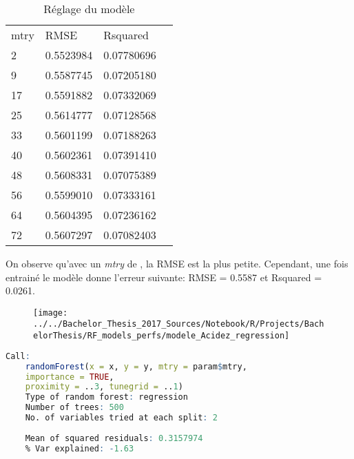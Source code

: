 \begin{table}[H]
	\centering
	\caption{Réglage du modèle}
	\label{RF_Acidez_Resampling}
	\begin{tabular}{llll}
	    mtry & RMSE      & Rsquared   \\
	    2    & 0.5523984 & 0.07780696 \\
	    9    & 0.5587745 & 0.07205180 \\
	    17   & 0.5591882 & 0.07332069 \\
	    25   & 0.5614777 & 0.07128568 \\
	    33   & 0.5601199 & 0.07188263 \\
	    40   & 0.5602361 & 0.07391410 \\
	    48   & 0.5608331 & 0.07075389 \\
	    56   & 0.5599010 & 0.07333161 \\
	    64   & 0.5604395 & 0.07236162 \\
	    72   & 0.5607297 & 0.07082403
	\end{tabular}
\end{table}

\noindent On observe qu'avec un \textit{mtry} de , la RMSE est la plus petite. Cependant, une fois entrainé le modèle donne l'erreur suivante: RMSE = 0.5587  et Rsquared = 0.0261. 

\begin{figure}[H]
	\centering
	\texttt{[image: ../../Bachelor\_Thesis\_2017\_Sources/Notebook/R/Projects/BachelorThesis/RF\_models\_perfs/modele\_Acidez\_regression]}
	\caption{}
	\label{fig:modeleacidezregression}
\end{figure}


\begin{minipage}{\linewidth}
	
	\begin{lstlisting}[showstringspaces=false,language=R, caption={Test du modèle de classification},captionpos=b]
	Call:
	randomForest(x = x, y = y, mtry = param$mtry, 
	importance = TRUE,      
	proximity = ..3, tunegrid = ..1) 
	Type of random forest: regression
	Number of trees: 500
	No. of variables tried at each split: 2
	
	Mean of squared residuals: 0.3157974
	% Var explained: -1.63
	\end{lstlisting}
\end{minipage}


